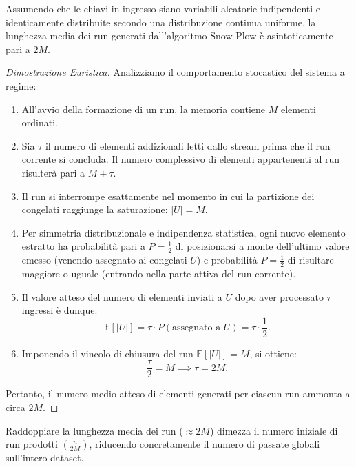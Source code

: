 \begin{theorem}
\label{thm:snow-plow-length}
Assumendo che le chiavi in ingresso siano variabili aleatorie indipendenti e identicamente distribuite secondo una distribuzione continua uniforme, la lunghezza media dei run generati dall'algoritmo Snow Plow \`e asintoticamente pari a $2M$.
\end{theorem}

\begin{proof}[Dimostrazione Euristica]
Analizziamo il comportamento stocastico del sistema a regime:
\begin{enumerate}
  \item All'avvio della formazione di un run, la memoria contiene $M$ elementi ordinati.
  \item Sia $\tau$ il numero di elementi addizionali letti dallo stream prima che il run corrente si concluda. Il numero complessivo di elementi appartenenti al run risulterà pari a $M + \tau$.
  \item Il run si interrompe esattamente nel momento in cui la partizione dei congelati raggiunge la saturazione: $\vert{}U\vert{} = M$.
  \item Per simmetria distribuzionale e indipendenza statistica, ogni nuovo elemento estratto ha probabilità pari a $P = \frac{1}{2}$ di posizionarsi a monte dell'ultimo valore emesso (venendo assegnato ai congelati $U$) e probabilità $P = \frac{1}{2}$ di risultare maggiore o uguale (entrando nella parte attiva del run corrente).
  \item Il valore atteso del numero di elementi inviati a $U$ dopo aver processato $\tau$ ingressi è dunque:
  \begin{equation}
    \mathbb{E}[\vert{}U\vert{}] = \tau \cdot P(\text{assegnato a } U) = \tau \cdot \frac{1}{2}.
  \end{equation}
  \item Imponendo il vincolo di chiusura del run $\mathbb{E}[\vert{}U\vert{}] = M$, si ottiene:
  \begin{equation}
    \frac{\tau}{2} = M \implies \tau = 2M.
  \end{equation}
\end{enumerate}
Pertanto, il numero medio atteso di elementi generati per ciascun run ammonta a circa $2M$.
\end{proof}

Raddoppiare la lunghezza media dei run ($\approx 2M$) dimezza il numero iniziale di run prodotti $\left(\frac{n}{2M}\right)$, riducendo concretamente il numero di passate globali sull'intero dataset.

